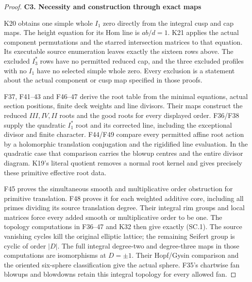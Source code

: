 \begin{proof}
\par

\medskip\noindent\textbf{C3. Necessity and construction through exact maps}

\par\nobreak

K20 obtains one simple whole \(I_1\) zero directly from
the integral cusp and cap maps. The height equation
for its Hom line is \(ab/d=1\). K21 applies the actual
component permutations and the starred intersection
matrices to that equation. Its executable source
enumeration leaves exactly the sixteen rows above.
The excluded \(I_3^*\) rows have no permitted reduced
cap, and the three excluded profiles with no \(I_1\)
have no selected simple whole zero. Every exclusion
is a statement about the actual component or cusp
map specified in those proofs.

F37, F41--43 and F46--47 derive the root table from
the minimal equations, actual section positions,
finite deck weights and line divisors. Their maps
construct the reduced \(III,IV,II\) roots and the
good roots for every displayed order. F36/F38 supply
the quadratic \(I_1^*\) root and its corrected
line, including the exceptional divisor and
finite character. F44/F49 compare every permitted
affine root action by a holomorphic translation
conjugation and the rigidified line evaluation.
In the quadratic case that comparison carries
the blowup centres and the entire divisor diagram.
K19's literal quotient removes a normal root
kernel and gives precisely these primitive
effective root data.

F45 proves the simultaneous smooth and multiplicative
order obstruction for primitive translation. F48
proves it for each weighted additive core, including
all primes dividing its source translation degree.
Their integral rim groups and local matrices force
every added smooth or multiplicative order to be one.
The topology computations in F36--47 and K32 then
give exactly (SC.1). The source vanishing cycles
kill the original elliptic lattice; the remaining
Seifert group is cyclic of order \(|D|\).
The full integral degree-two and degree-three maps
in those computations are isomorphisms at
\(D=\pm1\). Their Hopf/Gysin comparison and the
oriented six-sphere classification give the
actual sphere. F35's chartwise fan blowups and
blowdowns retain this integral topology for
every allowed fan.


\end{proof}
